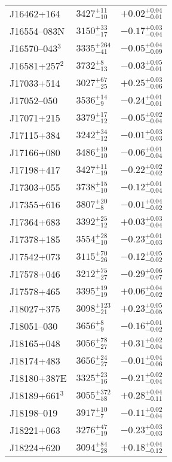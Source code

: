 \documentclass{aa}
\begin{document}
\begin{appendix}
\begin{center}
\begin{xtabular}{lll}
J16462+164 & $3427_{-10}^{+11}$ & $+0.02_{-0.01}^{+0.04}$ \\
J16554--083N & $3150_{-17}^{+33}$ & $-0.17_{-0.04}^{+0.03}$ \\
J16570--043$^{3}$ & $3335_{-41}^{+264}$ & $-0.05_{-0.09}^{+0.04}$ \\
J16581+257$^{2}$ & $3732_{-13}^{+8}$ & $-0.03_{-0.01}^{+0.05}$ \\
J17033+514 & $3027_{-25}^{+67}$ & $+0.25_{-0.06}^{+0.03}$ \\
J17052--050 & $3536_{-9}^{+14}$ & $-0.24_{-0.01}^{+0.01}$ \\
J17071+215 & $3379_{-12}^{+17}$ & $-0.05_{-0.04}^{+0.02}$ \\
J17115+384 & $3242_{-12}^{+34}$ & $-0.01_{-0.03}^{+0.03}$ \\
J17166+080 & $3486_{-10}^{+19}$ & $-0.06_{-0.04}^{+0.01}$ \\
J17198+417 & $3427_{-19}^{+11}$ & $-0.22_{-0.02}^{+0.02}$ \\
J17303+055 & $3738_{-10}^{+15}$ & $-0.12_{-0.04}^{+0.01}$ \\
J17355+616 & $3807_{-8}^{+20}$ & $-0.01_{-0.02}^{+0.04}$ \\
J17364+683 & $3392_{-12}^{+25}$ & $+0.03_{-0.04}^{+0.03}$ \\
J17378+185 & $3554_{-10}^{+28}$ & $-0.23_{-0.03}^{+0.01}$ \\
J17542+073 & $3115_{-26}^{+70}$ & $-0.12_{-0.02}^{+0.05}$ \\
J17578+046 & $3212_{-27}^{+75}$ & $-0.29_{-0.07}^{+0.06}$ \\
J17578+465 & $3395_{-19}^{+19}$ & $+0.06_{-0.02}^{+0.04}$ \\
J18027+375 & $3098_{-21}^{+123}$ & $+0.23_{-0.05}^{+0.05}$ \\
J18051--030 & $3656_{-9}^{+8}$ & $-0.16_{-0.02}^{+0.01}$ \\
J18165+048 & $3056_{-27}^{+78}$ & $+0.31_{-0.04}^{+0.02}$ \\
J18174+483 & $3656_{-27}^{+24}$ & $-0.01_{-0.06}^{+0.04}$ \\
J18180+387E & $3325_{-16}^{+23}$ & $-0.21_{-0.04}^{+0.02}$ \\
J18189+661$^{3}$ & $3055_{-58}^{+372}$ & $+0.28_{-0.11}^{+0.04}$ \\
J18198--019 & $3917_{-7}^{+10}$ & $-0.11_{-0.04}^{+0.02}$ \\
J18221+063 & $3276_{-19}^{+47}$ & $-0.23_{-0.03}^{+0.03}$ \\
J18224+620 & $3094_{-28}^{+84}$ & $+0.18_{-0.12}^{+0.04}$ \\

\end{xtabular}
\end{center}
\end{appendix}
\end{document}
